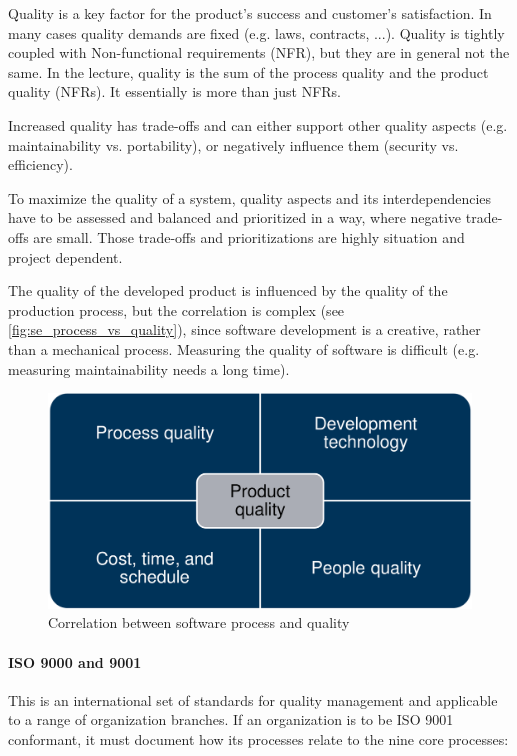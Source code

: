 Quality is a key factor for the product's success and customer's satisfaction.
In many cases quality demands are fixed (e.g. laws, contracts, ...).
Quality is tightly coupled with Non-functional requirements (NFR), but they are in general not the same.
In the lecture, quality is the sum of the process quality and the product quality (NFRs). It essentially is more than just NFRs.

Increased quality has trade-offs and can either support other quality aspects (e.g. maintainability vs. portability), or negatively influence them (security vs. efficiency).

To maximize the quality of a system, quality aspects and its interdependencies have to be assessed and balanced and prioritized in a way, where negative trade-offs are small.
Those trade-offs and prioritizations are highly situation and project dependent.

The quality of the developed product is influenced by the quality of the production process, but the correlation is complex (see \autoref{fig:se_process_vs_quality}), since software development is a creative, rather than a mechanical process.
Measuring the quality of software is difficult (e.g. measuring maintainability needs a long time).

\begin{figure}[h]
    \centering
    \includegraphics[width=0.5\linewidth]{images/process_vs_quality.png}
    \caption{Correlation between software process and quality}\label{fig:se_process_vs_quality}
\end{figure}

\paragraph{ISO 9000 and 9001}
This is an international set of standards for quality management and applicable to a range of organization branches.
If an organization is to be ISO 9001 conformant, it must document how its
processes relate to the nine core processes:\\


